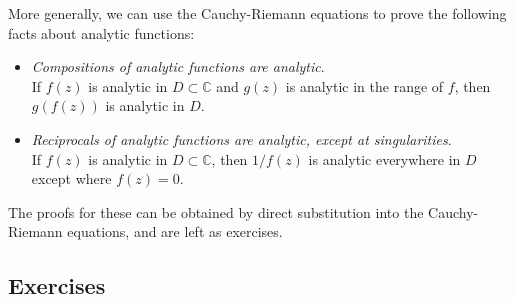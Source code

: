 \documentclass[10pt,a4paper]{article}
\begin{document}
More generally, we can use the Cauchy-Riemann equations to prove the
following facts about analytic functions:

\begin{itemize}
\item
  \emph{Compositions of analytic functions are analytic}.
  \\ If $f(z)$ is analytic in $D \subset \mathbb{C}$ and $g(z)$ is
    analytic in the range of $f$, then $g(f(z))$ is analytic in $D$.

\item
  \emph{Reciprocals of analytic functions are analytic, except at
  singularities}. \\ If $f(z)$ is analytic in $D \subset \mathbb{C}$,
  then $1/f(z)$ is analytic everywhere in $D$ except where
  $f(z) = 0$.
\end{itemize}

\noindent
The proofs for these can be obtained by direct substitution into the
Cauchy-Riemann equations, and are left as exercises.

\subsection{Exercises}
\label{exercises}
\end{document}
